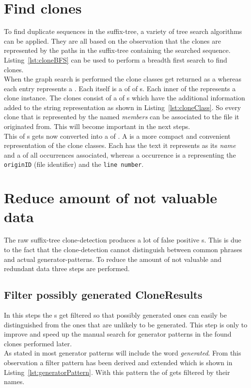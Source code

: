 \section{Find clones}
\label{section:findClones}
To find duplicate sequences in the suffix-tree, a variety of tree search algorithms can be applied. They are all based on the observation that the clones are represented by the paths in the suffix-tree containing the searched sequence. Listing~\ref{lst:cloneBFS} can be used to perform a breadth first search to find clones.\\
When the graph search is performed the clone classes get returned as a  whereas each entry represents a . Each  itself is a  of  of s. Each inner  of the  represents a clone instance. The clones consist of a  of s which have the additional information added to the string representation as shown in Listing~\ref{lst:cloneClass}. So every clone that is represented by the  named \textit{members} can be associated to the file it originated from. This will become important in the next steps.\\
This  of s gets now converted into a  of . A  is a more compact and convenient representation of the clone classes. Each has the text it represents as its \textit{name} and a  of all occurrences associated, whereas a occurrence is a  representing the \texttt{originID} (file identifier) and the \texttt{line number}. 




\section{Reduce amount of not valuable data}
\label{section:processCloneResults}
The raw suffix-tree clone-detection produces a lot of false positive s. This is due to the fact that the clone-detection cannot distinguish between common phrases and actual generator-patterns. To reduce the amount of not valuable and redundant data three steps are performed.
\subsection{Filter possibly generated CloneResults}
\label{section:filterCloneResults}
In this steps the s get filtered so that possibly generated ones can easily be distinguished from the ones that are unlikely to be generated. This step is only to improve and speed up the manual search for generator patterns in the found clones performed later.\\
As stated in \cite{Bernwieser2014} most generator patterns will include the word \textit{generated}. From this observation a filter pattern has been derived and extended which is shown in Listing~\ref{lst:generatorPattern}. With this pattern the  of  gets filtered by their names.


